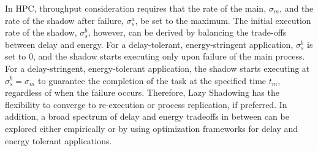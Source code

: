 In HPC, throughput consideration requires that the rate of the main, $\sigma_m$, and the rate of the shadow after failure, 
$\sigma_s^a$, be set to the maximum. 
The initial execution rate of the shadow, $\sigma_s^b$, however, can be derived by balancing the trade-offs between delay and energy.
For a delay-tolerant, energy-stringent application, $\sigma_s^b$ is set to 0, and the shadow starts executing only upon failure of the main process. %
For a delay-stringent, energy-tolerant application, the shadow starts executing at $\sigma_s^b=\sigma_m$ to guarantee the completion of the task at the specified time $t_m$, regardless of when the failure occurs. Therefore, Lazy Shadowing has the flexibility to converge to re-execution or process replication, if preferred. In addition,  
a broad spectrum of delay and energy tradeoffs in between can be explored either empirically or by using optimization frameworks for delay and energy tolerant applications.









